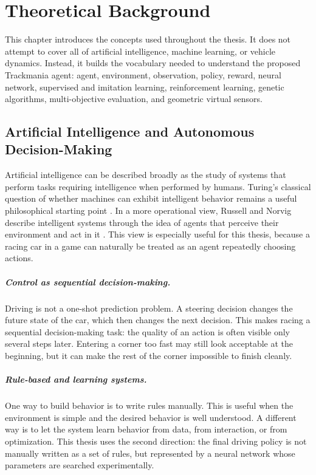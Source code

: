 \chapter{Theoretical Background}

This chapter introduces the concepts used throughout the thesis. It does not attempt to cover all of artificial intelligence, machine learning, or vehicle dynamics. Instead, it builds the vocabulary needed to understand the proposed Trackmania agent: agent, environment, observation, policy, reward, neural network, supervised and imitation learning, reinforcement learning, genetic algorithms, multi-objective evaluation, and geometric virtual sensors.

\section{Artificial Intelligence and Autonomous Decision-Making}

Artificial intelligence can be described broadly as the study of systems that perform tasks requiring intelligence when performed by humans. Turing's classical question of whether machines can exhibit intelligent behavior remains a useful philosophical starting point \cite{turing1950computing}. In a more operational view, Russell and Norvig describe intelligent systems through the idea of agents that perceive their environment and act in it \cite{russell_norvig_aima2021}. This view is especially useful for this thesis, because a racing car in a game can naturally be treated as an agent repeatedly choosing actions.

\paragraph{Control as sequential decision-making.}
Driving is not a one-shot prediction problem. A steering decision changes the future state of the car, which then changes the next decision. This makes racing a sequential decision-making task: the quality of an action is often visible only several steps later. Entering a corner too fast may still look acceptable at the beginning, but it can make the rest of the corner impossible to finish cleanly.

\paragraph{Rule-based and learning systems.}
One way to build behavior is to write rules manually. This is useful when the environment is simple and the desired behavior is well understood. A different way is to let the system learn behavior from data, from interaction, or from optimization. This thesis uses the second direction: the final driving policy is not manually written as a set of rules, but represented by a neural network whose parameters are searched experimentally.

